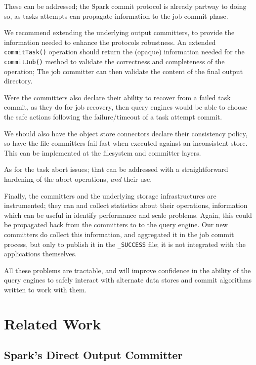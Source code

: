 \documentclass[conference]{IEEEtran}
\begin{document}
These can be addressed;
the Spark commit protocol is already partway to doing so, as tasks attempts
can propagate information to the job commit phase.

We recommend extending the underlying output committers, to provide the
information needed to enhance the protocols robustness.
An extended  \texttt{commitTask()} operation should return the (opaque) information
needed for the \texttt{commitJob()} method to validate the correctness and
completeness of the operation;
The job committer can then validate the content of the final output directory.

Were the committers also declare their ability to recover from a failed task commit,
as they do for job recovery, then query engines would be able to choose the safe
actions following the failure/timeout of a task attempt commit.

We should also have the object store connectors declare their consistency policy,
so have the file committers fail fast when executed against an inconsistent store.
This can be implemented at the filesystem and committer layers.

As for the task abort issues;
that can be addressed with a straightforward hardening of the abort operations,
\emph{and} their use.

Finally, the committers and the underlying storage infrastructures are instrumented;
they can and collect statistics about their operations, information
which can be useful in identify performance and scale problems.
Again, this could be propagated back from the committers to to the
query engine.
Our new committers do collect this information, and aggregated it in the
job commit process, but only to publish it in the \texttt{_SUCCESS} file;
it is not integrated with the applications themselves.

All these problems are tractable, and will improve confidence in the ability
of the query engines to safely interact with alternate data stores and
commit algorithms written to work with them.



\section{Related Work}
\label{sec:related-work}

\subsection{Spark's Direct Output Committer}
\label{subsec:direct-output}
\end{document}
